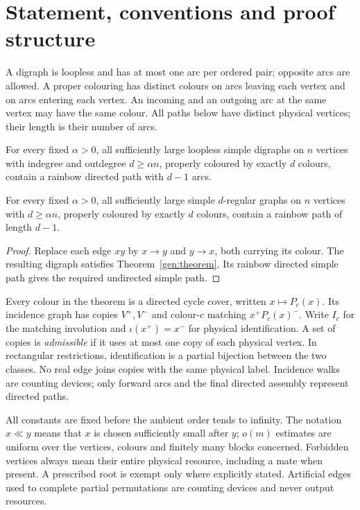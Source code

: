 \section{Statement, conventions and proof structure}\label{sec:intro}
A digraph is loopless and has at most one arc per ordered pair; opposite arcs are allowed. A proper colouring has distinct colours on arcs leaving each vertex and on arcs entering each vertex. An incoming and an outgoing arc at the same vertex may have the same colour. All paths below have distinct physical vertices; their length is their number of arcs.
\begin{theorem}\label{gen:theorem}
For every fixed $\alpha>0$, all sufficiently large loopless simple digraphs on $n$ vertices with indegree and outdegree $d\ge\alpha{}n$, properly coloured by exactly $d$ colours, contain a rainbow directed path with $d-1$ arcs.
\end{theorem}
\begin{corollary}\label{gen:undirected}
For every fixed $\alpha>0$, all sufficiently large simple $d$-regular graphs on $n$ vertices with $d\ge\alpha{}n$, properly coloured by exactly $d$ colours, contain a rainbow path of length $d-1$.
\end{corollary}
\begin{proof}
Replace each edge $xy$ by $x\to{}y$ and $y\to{}x$, both carrying its colour. The resulting digraph satisfies Theorem~\ref{gen:theorem}. Its rainbow directed simple path gives the required undirected simple path.
\end{proof}

Every colour in the theorem is a directed cycle cover, written $x\mapsto{}P_c(x)$. Its incidence graph has copies $V^+,V^-$ and colour-$c$ matching $x^+P_c(x)^-$. Write $I_c$ for the matching involution and $\iota(x^+)=x^-$ for physical identification. A set of copies is \emph{admissible} if it uses at most one copy of each physical vertex. In rectangular restrictions, identification is a partial bijection between the two classes. No real edge joins copies with the same physical label. Incidence walks are counting devices; only forward arcs and the final directed assembly represent directed paths.

All constants are fixed before the ambient order tends to infinity. The notation $x\ll{}y$ means that $x$ is chosen sufficiently small after $y$; $o(m)$ estimates are uniform over the vertices, colours and finitely many blocks concerned. Forbidden vertices always mean their entire physical resource, including a mate when present. A prescribed root is exempt only where explicitly stated. Artificial edges used to complete partial permutations are counting devices and never output resources.


